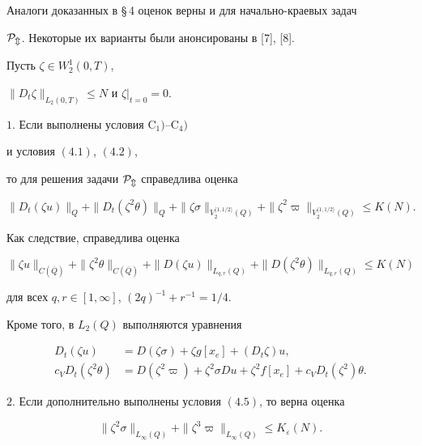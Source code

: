 Аналоги доказанных в \S\,4 оценок верны и для начально-краевых задач


$\cal P_m$. Некоторые их варианты были анонсированы в [7], [8].





Пусть $\zeta\in W^1_2(0,T)$,


$\|D_t\zeta\|_{L_2(0,T)}\le N$ и $\zeta|_{t=0}=0$.





\begin{thms} 


$1.$ Если выполнены условия $\mathrm C_1)$--$\mathrm C_4)$


и условия $(4.1)$, $(4.2)$,


то для решения задачи $\cal P_m$ справедлива оценка


\begin{equation}


\|D_t(\zeta u)\|_Q+\|D_t(\zeta^2\theta)\|_Q+


\|\zeta\sigma\|_{V_2^{\langle1,1/2\rangle}(Q)}+


\|\zeta^2\varpi\|_{V_2^{\langle1,1/2\rangle}(Q)}\le K(N).


\end{equation}


Как следствие, справедлива оценка


\begin{equation}


\|\zeta u\|_{C(\overline Q)}+\|\zeta^2\theta\|_{C(\overline Q)}+


\|D(\zeta u)\|_{L_{q,r}(Q)}+\|D(\zeta^2\theta)\|_{L_{q,r}(Q)}\le K(N)


\end{equation}


для всех $q,r\in [1,\infty]$, $(2q)^{-1}+r^{-1}=1/4$.


Кроме того, в $L_2(Q)$ выполняются уравнения


\begin{align}


D_t(\zeta u)&=D(\zeta\sigma)+\zeta g[x_e]+(D_t\zeta)u,\\


c_V D_t(\zeta^2\theta)&=D(\zeta^2\varpi)+


\zeta^2\sigma Du+\zeta^2f[x_e]+c_VD_t(\zeta^2)\theta.


\end{align}





$2.$ Если дополнительно выполнены условия $(4.5)$, то верна оценка


\begin{equation}


\|\zeta^2\sigma\|_{L_\infty(Q)}+\|\zeta^3\varpi\|_{L_\infty(Q)}


\le K_{\varepsilon}(N).


\end{equation}


\end{thms}





